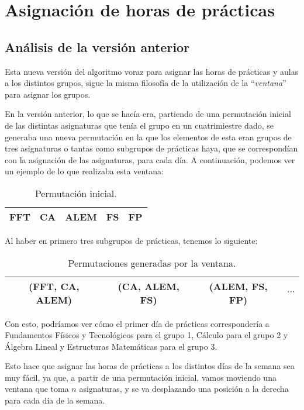 \section{Asignación de horas de prácticas}

\subsection{Análisis de la versión anterior}

Esta nueva versión del algoritmo voraz para asignar las horas de prácticas y aulas a los distintos grupos, sigue la misma filosofía de la utilización de la ``\textit{ventana}'' para asignar los grupos. 

En la versión anterior, lo que se hacía era, partiendo de una permutación inicial de las distintas asignaturas que tenía el grupo en un cuatrimiestre dado, se generaba una nueva permutación en la que los elementos de esta eran grupos de tres asignaturas o tantas como subgrupos de prácticas haya, que se correspondían con la asignación de las asignaturas, para cada día. A continuación, podemos ver un ejemplo de lo que realizaba esta ventana:
\begin{table}[H]
\begin{center}
\begin{tabular}{|c|c|c|c|c|}
\hline
FFT & CA & ALEM & FS & FP\\
\hline
\end{tabular}
\caption{Permutación inicial.}
\end{center}
\end{table}
Al haber en primero tres subgrupos de prácticas, tenemos lo siguiente:
\begin{table}[H]
\begin{center}
\begin{tabular}{|c|c|c|c|}
\hline
(FFT, CA, ALEM) & (CA, ALEM, FS) & (ALEM, FS, FP) & $\cdots$ \\
\hline
\end{tabular}
\caption{Permutaciones generadas por la ventana.}
\end{center}
\end{table}

Con esto, podríamos ver cómo el primer día de prácticas correspondería a Fundamentos Físicos y Tecnológicos para el grupo 1, Cálculo para el grupo 2 y Álgebra Lineal y Estructuras Matemáticas para el grupo 3.

Esto hace que asignar las horas de prácticas a los distintos días de la semana sea muy fácil, ya que, a partir de una permutación inicial, vamos moviendo una ventana que toma $n$ asignaturas, y se va desplazando una posición a la derecha para cada día de la semana. 

